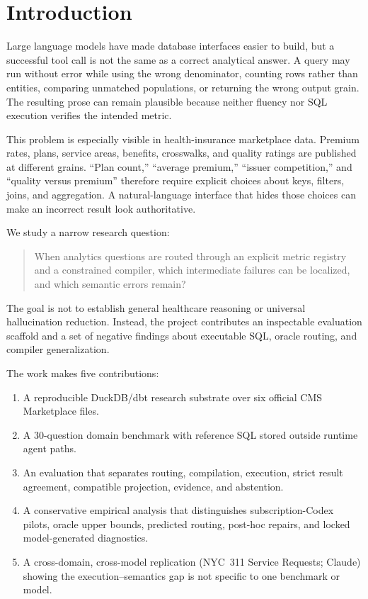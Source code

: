 \documentclass[11pt]{article}
\begin{document}
\section{Introduction}

Large language models have made database interfaces easier to build, but a
successful tool call is not the same as a correct analytical answer. A query may
run without error while using the wrong denominator, counting rows rather than
entities, comparing unmatched populations, or returning the wrong output grain.
The resulting prose can remain plausible because neither fluency nor SQL
execution verifies the intended metric.

This problem is especially visible in health-insurance marketplace data. Premium
rates, plans, service areas, benefits, crosswalks, and quality ratings are
published at different grains. ``Plan count,'' ``average premium,'' ``issuer
competition,'' and ``quality versus premium'' therefore require explicit choices
about keys, filters, joins, and aggregation. A natural-language interface that
hides those choices can make an incorrect result look authoritative.

We study a narrow research question:

\begin{quote}
When analytics questions are routed through an explicit metric registry and a
constrained compiler, which intermediate failures can be localized, and which
semantic errors remain?
\end{quote}

The goal is not to establish general healthcare reasoning or universal
hallucination reduction. Instead, the project contributes an inspectable
evaluation scaffold and a set of negative findings about executable SQL, oracle
routing, and compiler generalization.

The work makes five contributions:
\begin{enumerate}[itemsep=2pt,topsep=2pt]
  \item A reproducible DuckDB/dbt research substrate over six official CMS
    Marketplace files.
  \item A 30-question domain benchmark with reference SQL stored outside runtime
    agent paths.
  \item An evaluation that separates routing, compilation, execution, strict
    result agreement, compatible projection, evidence, and abstention.
  \item A conservative empirical analysis that distinguishes subscription-Codex
    pilots, oracle upper bounds, predicted routing, post-hoc repairs, and locked
    model-generated diagnostics.
  \item A cross-domain, cross-model replication (NYC~311 Service Requests;
    Claude) showing the execution--semantics gap is not specific to one
    benchmark or model.
\end{enumerate}
\end{document}
